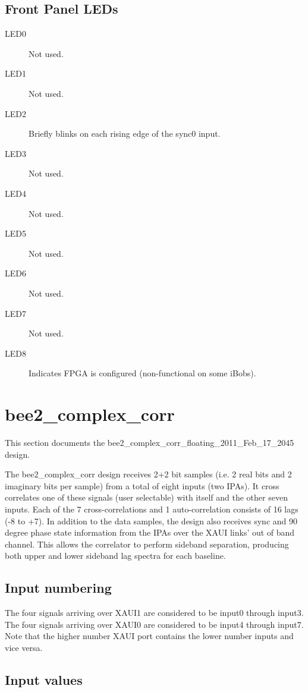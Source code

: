 \documentclass[12pt]{article}
\begin{document}
\filbreak
  \subsection{Front Panel LEDs}
\begin{description}
\item[LED0] Not used.
\item[LED1] Not used.
\item[LED2] Briefly blinks on each rising edge of the sync0 input.
\item[LED3] Not used.
\item[LED4] Not used.
\item[LED5] Not used.
\item[LED6] Not used.
\item[LED7] Not used.
\item[LED8] Indicates FPGA is configured (non-functional on some iBobs).
\end{description}

\newpage
\section{bee2\_complex\_corr}

This section documents the bee2\_complex\_corr\_floating\_2011\_Feb\_17\_2045
design.

The bee2\_complex\_corr design receives 2+2 bit samples (i.e. 2 real bits and 2
imaginary bits per sample) from a total of eight inputs (two IPAs).  It cross
correlates one of these signals (user selectable) with itself and the other
seven inputs.  Each of the 7 cross-correlations and 1 auto-correlation consists
of 16 lags (-8 to +7).  In addition to the data samples, the design also
receives sync and 90 degree phase state information from the IPAs over the XAUI
links' out of band channel.  This allows the correlator to perform sideband
separation, producing both upper and lower sideband lag spectra for each
baseline.

\subsection{Input numbering}

The four signals arriving over XAUI1 are considered to be input0 through
input3.  The four signals arriving over XAUI0 are considered to be input4
through input7.  Note that the higher number XAUI port contains the lower
number inputs and vice versa.

\subsection{Input values}
\end{document}
